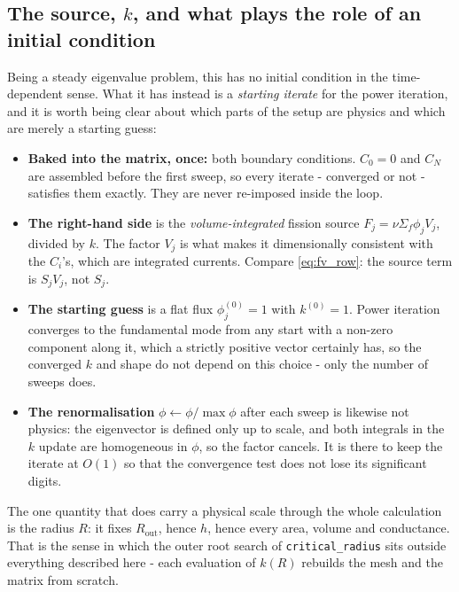 \documentclass[11pt]{article}
\begin{document}
{\subsection*{The source, $k$, and what plays the role of an initial condition}

Being a steady eigenvalue problem, this has no initial condition in the time-dependent sense. What it has instead is a \emph{starting iterate} for the power iteration, and it is worth being clear about which parts of the setup are physics and which are merely a starting guess:

\begin{itemize}
    \item \textbf{Baked into the matrix, once:} both boundary conditions. $C_0 = 0$ and $C_N$ are assembled before the first sweep, so every iterate - converged or not - satisfies them exactly. They are never re-imposed inside the loop.
    \item \textbf{The right-hand side} is the \emph{volume-integrated} fission source $F_j = \nu\Sigma_f \phi_j V_j$, divided by $k$. The factor $V_j$ is what makes it dimensionally consistent with the $C_i$'s, which are integrated currents. Compare \eqref{eq:fv_row}: the source term is $S_j V_j$, not $S_j$.
    \item \textbf{The starting guess} is a flat flux $\phi^{(0)}_j = 1$ with $k^{(0)} = 1$. Power iteration converges to the fundamental mode from any start with a non-zero component along it, which a strictly positive vector certainly has, so the converged $k$ and shape do not depend on this choice - only the number of sweeps does.
    \item \textbf{The renormalisation} $\phi \leftarrow \phi/\max\phi$ after each sweep is likewise not physics: the eigenvector is defined only up to scale, and both integrals in the $k$ update are homogeneous in $\phi$, so the factor cancels. It is there to keep the iterate at $O(1)$ so that the convergence test does not lose its significant digits.
\end{itemize}

The one quantity that does carry a physical scale through the whole calculation is the radius $R$: it fixes $R_{\text{out}}$, hence $h$, hence every area, volume and conductance. That is the sense in which the outer root search of \texttt{critical\_radius} sits outside everything described here - each evaluation of $k(R)$ rebuilds the mesh and the matrix from scratch.

}
\end{document}
